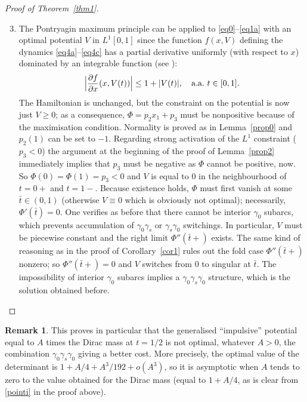\documentclass[JEP,XML,SOM,Unicode,NoEqCountersInSection,NoFloatCountersInSection]{cedram}
\theoremstyle{plain}
\theoremstyle{definition}
\newtheorem{remark}[theorem]{Remark}
\renewcommand{\dot}[1]{#1'}
\renewcommand{\ddot}[1]{#1''}
\newcommand{\frp}[2]{\frac{\partial #1}{\partial #2}}
\begin{document}
\begin{proof}[Proof of Theorem~\ref{thm1}]
\begin{enumerate}\setcounter{enumi}{2}
\item\label{pointiii}
The Pontryagin maximum principle can be applied to \eqref{eq0}--\eqref{eq1a}
with an optimal potential $V$ in $L^1[0,1]$ since the function $f(x,V)$
defining the dynamics
\eqref{eq4a}--\eqref{eq4c} has a partial derivative uniformly (with respect to $x$) dominated by
an integrable function (see \cite[\S 4.2.C, Rem.\,5]{cesari-1983a}):
\[
\Bigl|\frp{f}{x}(x,V(t))\Bigr| \leq 1+|V(t)|,\quad \text{a.a.\ }t \in [0,1].
\]
The Hamiltonian is unchanged, but the constraint on the potential is now just $V \geq 0$;
as a consequence, $\Phi=p_2x_1+p_3$ must be nonpositive because of the maximisation
condition. Normality is proved as in Lemma~\ref{prop0} and $p_2(1)$ can be set to $-1$.
Regarding strong activation of the $L^1$ constraint ($p_3<0$) the argument at the
beginning of the proof of Lemma~\ref{prop2} immediately implies that $p_3$ must be
negative as $\Phi$ cannot be positive, now. So $\Phi(0)=\Phi(1)=p_3<0$ and $V$ is
equal to $0$ in the neighbourhood of $t=0+$ and $t=1-$. Because existence holds,
$\Phi$ must first vanish at some $\bar{t} \in (0,1)$ (otherwise $V \equiv 0$ which is
obviously not optimal); necessarily, $\dot{\Phi}(\bar{t})=0$. One verifies as before
that there cannot be interior $\gamma_0$ subarcs, which prevents accumulation of
$\gamma_0\gamma_s$ or $\gamma_s\gamma_0$ switchings. In particular, $V$ must be piecewise
constant and the right limit $\ddot{\Phi}(\bar{t}+)$ exists. The same kind of reasoning
as in the proof of Corollary~\ref{cor1} rules out the fold case $\ddot{\Phi}(\bar{t}+)$
nonzero; so $\ddot{\Phi}(\bar{t}+)=0$ and $V$ switches from $0$ to singular at
$\bar{t}$. The impossibility of interior $\gamma_0$ subarcs implies a
$\gamma_0\gamma_s\gamma_0$ structure, which is the solution obtained before.\qedhere
\end{enumerate}
\end{proof}

\begin{remark}
This proves in particular that the generalised
``impulsive'' potential equal to $A$ times the
Dirac mass at $t=1/2$ is not optimal, whatever $A>0$,
the combination $\gamma_0\gamma_s\gamma_0$ giving a better cost.
More precisely, the optimal value of the determinant is $1+A/4+A^3/192+o(A^3)$,
so it is asymptotic when $A$ tends to zero to the value obtained for the Dirac mass
(equal to $1+A/4$, as is clear from \eqref{pointi} in the proof above).
\end{remark}
\end{document}
